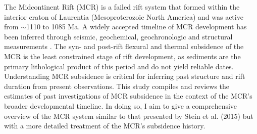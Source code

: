 \documentclass[12pt,letterpaper]{article}
\renewenvironment{abstract}
 {\small
  \begin{center}
  \bfseries \abstractname\vspace{-.5em}\vspace{0pt}
  \end{center}
  \list{}{
    \setlength{\leftmargin}{.5cm}%
    \setlength{\rightmargin}{\leftmargin}%
  }%
  \item\relax}
 {\endlist}
\begin{document}
\begin{abstract}
\hline
The Midcontinent Rift (MCR) is a failed rift system that formed within the interior craton of Laurentia (Mesoproterozoic North America) and was active from $\sim$1110 to 1085 Ma. 
A widely accepted timeline of MCR development has been inferred through seismic, geochemical, geochronologic and structural measurements \citep{Cannon1989a,Cannon1992b,White1997a,Stein2015a}. The syn- and post-rift flexural and thermal subsidence of the MCR is the least constrained stage of rift development, as sediments are the primary lithological product of this period and do not yield reliable dates. Understanding MCR subsidence is critical for inferring past structure and rift duration from present observations. This study compiles and reviews the estimates of past investigations of MCR subsidence in the context of the MCR's broader developmental timeline. In doing so, I aim to give a comprehensive overview of the MCR system similar to that presented by Stein et al. (2015) but with a more detailed treatment of the MCR's subsidence history.
\vspace{0.5em}\hline
\end{abstract}
\end{document}
